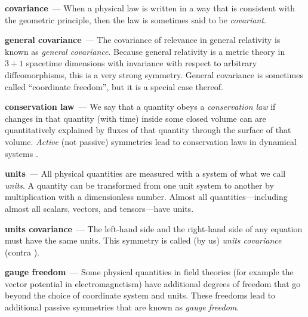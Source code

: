 \documentclass[11pt]{article}
\renewcommand{\paragraph}[1]{\medskip\par\noindent\textbf{#1}~---}
\begin{document}
\paragraph{covariance}
When a physical law is written in a way that is consistent with the geometric principle, then the law is sometimes said to be \emph{covariant}.

\paragraph{general covariance}
The covariance of relevance in general relativity \cite{einstein} is known as \emph{general covariance}.
Because general relativity is a metric theory in $3+1$ spacetime dimensions with invariance with respect to arbitrary diffeomorphisms, this is a very strong symmetry.
General covariance is sometimes called ``coordinate freedom'', but it is a special case thereof.

\paragraph{conservation law}
We say that a quantity obeys a \emph{conservation law} if changes in that quantity (with time) inside some closed volume can are quantitatively explained by fluxes of that quantity through the surface of that volume.
\emph{Active} (not passive) symmetries lead to conservation laws in dynamical systems \cite{noether}.

\paragraph{units}
All physical quantities are measured with a system of what we call \emph{units}.
A quantity can be transformed from one unit system to another by multiplication with a dimensionless number.
Almost all quantities---including almost all scalars, vectors, and tensors---have units.

\paragraph{units covariance}
The left-hand side and the right-hand side of any equation must have the same units.
This symmetry is called (by us) \emph{units covariance} (contra \cite{villar2022dimensionless}).

\paragraph{gauge freedom}
Some physical quantities in field theories (for example the vector potential in electromagnetism) have additional degrees of freedom that go beyond the choice of coordinate system and units.
These freedoms lead to additional passive symmetries that are known as \emph{gauge freedom}.
\end{document}
